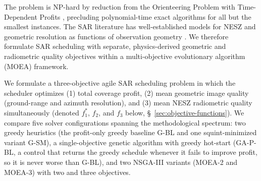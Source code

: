 \documentclass[preprint,12pt,authoryear]{elsarticle}
\begin{document}
The problem is NP-hard by reduction from the Orienteering Problem with
Time-Dependent Profits \citep{Peng2019Orienteering}, precluding
polynomial-time exact algorithms for all but the smallest instances.
The SAR literature has well-established models for NESZ and geometric resolution
as functions of observation geometry \citep{Curlander1991,Cumming2005}. We
therefore formulate SAR scheduling with separate,
physics-derived geometric and radiometric quality objectives within a
multi-objective evolutionary algorithm (MOEA) framework.

We formulate a three-objective agile SAR scheduling problem in which the
scheduler optimizes (1) total coverage profit, (2) mean geometric image quality
(ground-range and azimuth resolution), and (3) mean NESZ radiometric quality
simultaneously (denoted $f_1^*$, $f_2$, and $f_3$ below,
\S~\ref{sec:objective-functions}).
We compare five solver configurations spanning the methodological spectrum: two greedy
heuristics (the profit-only greedy baseline G-BL and one squint-minimized variant G-SM), a
single-objective genetic algorithm with greedy hot-start (GA-P-BL, a control
that returns the greedy schedule whenever it fails to improve profit, so it
is never worse than G-BL), and two NSGA-III
variants (MOEA-2 and MOEA-3) with two and three objectives.
\end{document}

